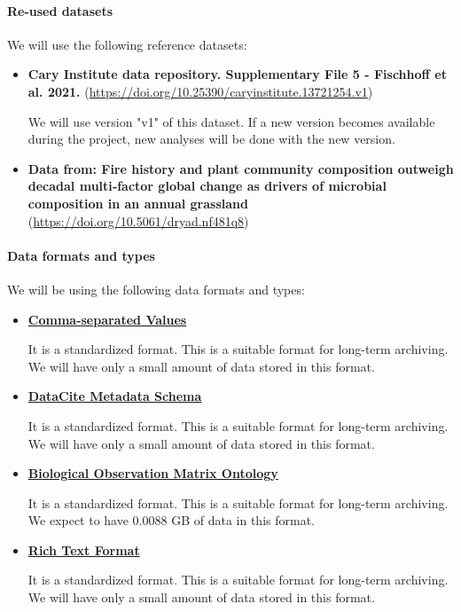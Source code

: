 \documentclass[
  english,
]{article}
\begin{document}
\hypertarget{re-used-datasets}{%
\paragraph{Re-used datasets}\label{re-used-datasets}}

We will use the following reference datasets:

\begin{itemize}
\item
  \textbf{Cary Institute data repository. Supplementary File 5 -
  Fischhoff et al. 2021.}
  (\url{https://doi.org/10.25390/caryinstitute.13721254.v1})

  We will use version "v1" of this dataset. If a new version becomes
  available during the project, new analyses will be done with the new
  version.
\item
  \textbf{Data from: Fire history and plant community composition
  outweigh decadal multi‐factor global change as drivers of microbial
  composition in an annual grassland}
  (\url{https://doi.org/10.5061/dryad.nf481q8})
\end{itemize}

\hypertarget{data-formats-and-types}{%
\paragraph{Data formats and types}\label{data-formats-and-types}}

We will be using the following data formats and types:

\begin{itemize}
\item
  \textbf{\href{https://fairsharing.org/bsg-s001546}{Comma-separated
  Values}}

  It is a standardized format. This is a suitable format for long-term
  archiving. We will have only a small amount of data stored in this
  format.
\item
  \textbf{\href{https://fairsharing.org/bsg-s000588}{DataCite Metadata
  Schema}}

  It is a standardized format. This is a suitable format for long-term
  archiving. We will have only a small amount of data stored in this
  format.
\item
  \textbf{\href{https://fairsharing.org/bsg-s000884}{Biological
  Observation Matrix Ontology}}

  It is a standardized format. This is a suitable format for long-term
  archiving. We expect to have 0.0088 GB of data in this format.
\item
  \textbf{\href{https://fairsharing.org/bsg-s001263}{Rich Text Format}}

  It is a standardized format. This is a suitable format for long-term
  archiving. We will have only a small amount of data stored in this
  format.
\end{itemize}
\end{document}

